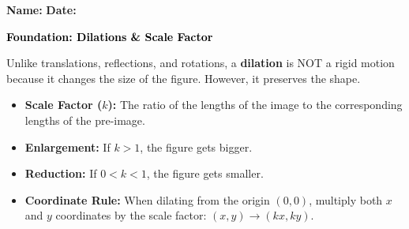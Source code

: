 \documentclass[12pt, letterpaper, fleqn]{article}
\begin{document}
\textbf{Name:} \underline{\hspace{5cm}}
\hfill
\textbf{Date:} \underline{\hspace{3cm}}\\

\begin{tcolorbox}[colback=customteal!20]
    \large\textcolor{black}{\textbf{Foundation: Dilations \& Scale Factor}}
\end{tcolorbox}

\vspace{3mm}

\noindent
Unlike translations, reflections, and rotations, a \textbf{dilation} is NOT a rigid motion because it changes the size of the figure. However, it preserves the shape. 

\begin{itemize}
    \item \textbf{Scale Factor ($k$):} The ratio of the lengths of the image to the corresponding lengths of the pre-image.
    \item \textbf{Enlargement:} If $k > 1$, the figure gets bigger.
    \item \textbf{Reduction:} If $0 < k < 1$, the figure gets smaller.
    \item \textbf{Coordinate Rule:} When dilating from the origin $(0,0)$, multiply both $x$ and $y$ coordinates by the scale factor: $(x, y) \rightarrow (kx, ky)$.
\end{itemize}

\vspace{4mm}
\end{document}
